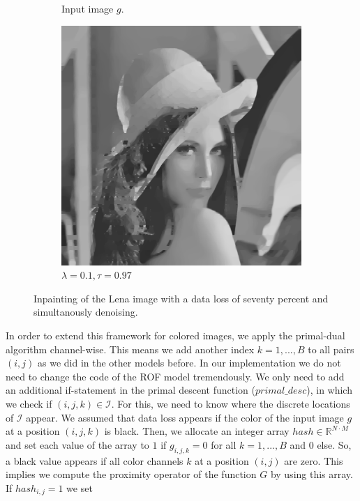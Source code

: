 \documentclass[abstracton]{scrreprt}
\begin{document}
\begin{figure}[!ht]
\begin{subfigure}[b]{0.30\textwidth}
                \caption{Input image $g$.}
            \end{subfigure}
            \begin{subfigure}[b]{0.30\textwidth}
                \includegraphics[width=\textwidth]{img/inpainting/01lena.png}
                \caption{$\lambda = 0.1, \tau = 0.97$}
            \end{subfigure}
            \caption[Inpainting with seventy percent data loss with denoising.]{Inpainting of the Lena image with a data loss of seventy percent and simultanously denoising.}
        \label{fig:inpainting_lena_rof}
        \end{figure}
        In order to extend this framework for colored images, we apply the primal-dual algorithm channel-wise. This means we add another index $k = 1, ..., B$ to all pairs $(i,j)$ as we did in the other models before. In our implementation we do not need to change the code of the ROF model tremendously. We only need to add an additional if-statement in the primal descent function ($primal\_desc$), in which we check if $(i,j,k) \in \mathcal{I}$. For this, we need to know where the discrete locations of $\mathcal{I}$ appear. We assumed that data loss appears if the color of the input image $g$ at a position $(i,j,k)$ is black. Then, we allocate an integer array $hash \in \mathbb{R}^{N \cdot M}$ and set each value of the array to $1$ if $g_{i,j,k} = 0$ for all $k = 1, ..., B$ and $0$ else. So, a black value appears if all color channels $k$ at a position $(i,j)$ are zero. This implies we compute the proximity operator of the function $G$ by using this array. If $hash_{i,j} = 1$ we set
\end{document}

